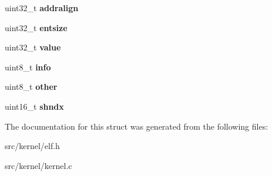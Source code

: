 \begin{DoxyCompactItemize}
uint32\+\_\+t {\bfseries addralign}
\item 
\mbox{\label{struct____attribute_____aa091f63cfc0b87a40e07812931993975}} 
uint32\+\_\+t {\bfseries entsize}
\item 
\mbox{\label{struct____attribute_____abf1ca67de7255468a778d05368edb90f}} 
uint32\+\_\+t {\bfseries value}
\item 
\mbox{\label{struct____attribute_____a68d7b10f60f896b896e152bb1c52eafe}} 
uint8\+\_\+t {\bfseries info}
\item 
\mbox{\label{struct____attribute_____a3445bb9b88b13eb0bd0213d35d639a17}} 
uint8\+\_\+t {\bfseries other}
\item 
\mbox{\label{struct____attribute_____af3a264dce180223529a9d2433d277abd}} 
uint16\+\_\+t {\bfseries shndx}
\end{DoxyCompactItemize}


The documentation for this struct was generated from the following files\+:\begin{DoxyCompactItemize}
\item 
src/kernel/elf.\+h\item 
src/kernel/kernel.\+c\end{DoxyCompactItemize}
